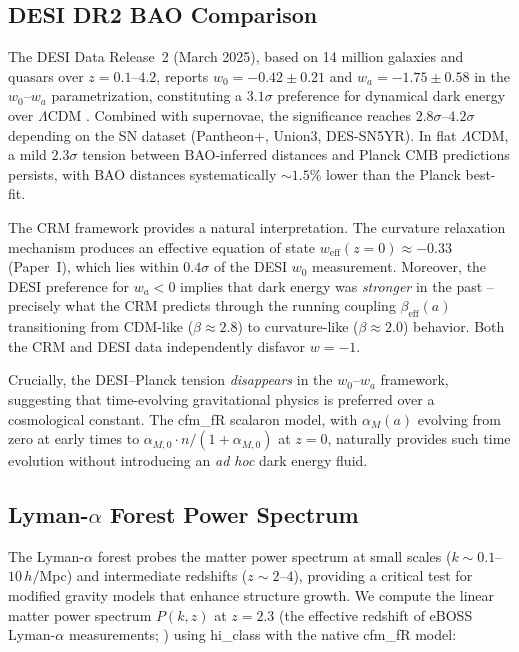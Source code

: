 \documentclass[aps,prd,twocolumn,superscriptaddress,nofootinbib]{revtex4-2}
\begin{document}
\subsection{DESI DR2 BAO Comparison}
\label{subsec:desi}

The DESI Data Release~2 (March 2025), based on 14 million galaxies and quasars over $z = 0.1$--$4.2$, reports $w_0 = -0.42 \pm 0.21$ and $w_a = -1.75 \pm 0.58$ in the $w_0$--$w_a$ parametrization, constituting a $3.1\sigma$ preference for dynamical dark energy over $\Lambda$CDM \cite{DESI2025}. Combined with supernovae, the significance reaches $2.8\sigma$--$4.2\sigma$ depending on the SN dataset (Pantheon+, Union3, DES-SN5YR). In flat $\Lambda$CDM, a mild $2.3\sigma$ tension between BAO-inferred distances and Planck CMB predictions persists, with BAO distances systematically $\sim 1.5\%$ lower than the Planck best-fit.

The CRM framework provides a natural interpretation. The curvature relaxation mechanism produces an effective equation of state $w_{\mathrm{eff}}(z=0) \approx -0.33$ (Paper~I), which lies within $0.4\sigma$ of the DESI $w_0$ measurement. Moreover, the DESI preference for $w_a < 0$ implies that dark energy was \textit{stronger} in the past -- precisely what the CRM predicts through the running coupling $\beta_{\mathrm{eff}}(a)$ transitioning from CDM-like ($\beta \approx 2.8$) to curvature-like ($\beta \approx 2.0$) behavior. Both the CRM and DESI data independently disfavor $w = -1$.

Crucially, the DESI--Planck tension \textit{disappears} in the $w_0$--$w_a$ framework, suggesting that time-evolving gravitational physics is preferred over a cosmological constant. The cfm\_fR scalaron model, with $\alpha_M(a)$ evolving from zero at early times to $\alpha_{M,0} \cdot n/(1 + \alpha_{M,0})$ at $z = 0$, naturally provides such time evolution without introducing an \textit{ad hoc} dark energy fluid.


\subsection{Lyman-$\alpha$ Forest Power Spectrum}
\label{subsec:lyman_alpha}

The Lyman-$\alpha$ forest probes the matter power spectrum at small scales ($k \sim 0.1$--$10\,h/$Mpc) and intermediate redshifts ($z \sim 2$--$4$), providing a critical test for modified gravity models that enhance structure growth. We compute the linear matter power spectrum $P(k,z)$ at $z = 2.3$ (the effective redshift of eBOSS Lyman-$\alpha$ measurements; \cite{Chabanier2019}) using hi\_class with the native cfm\_fR model:
\end{document}

